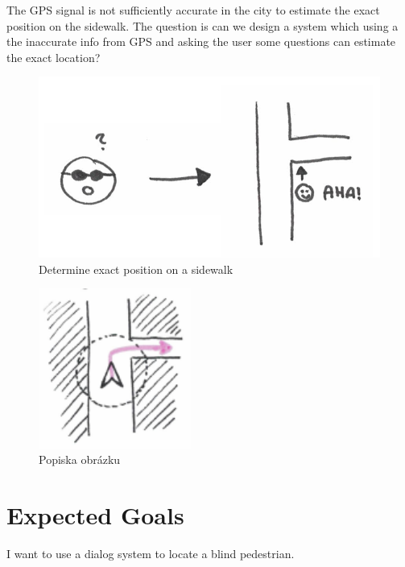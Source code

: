 \documentclass[11pt,twoside,a4paper]{book}
\begin{document}
	The GPS signal is not sufficiently accurate in the city to estimate the exact position on the sidewalk. The question is can we design a system which using a the inaccurate info from GPS and asking the user some questions can estimate the exact location?
	 
\begin{figure}[h]
	\centering
	\includegraphics[width=0.7\linewidth]{figures/introduction/determine-exact-position-on-sidewalk}
	\caption[Determine exact position on a sidewalk]{Determine exact position on a sidewalk}
	\label{fig:determine-exact-position-on-sidewalk}
\end{figure}
	
	
	
\begin{figure}[h]
	\centering
	\includegraphics[width=5cm]{figures/introduction/gps-shows}
	\caption[Current Navigations]{Popiska obrázku}
	\label{fig:gps-shows}
\end{figure}

	
	

	
	
	
	
	\section{Expected Goals}
	
	I want to use a dialog system to locate a blind pedestrian.
	
	
\end{document}
